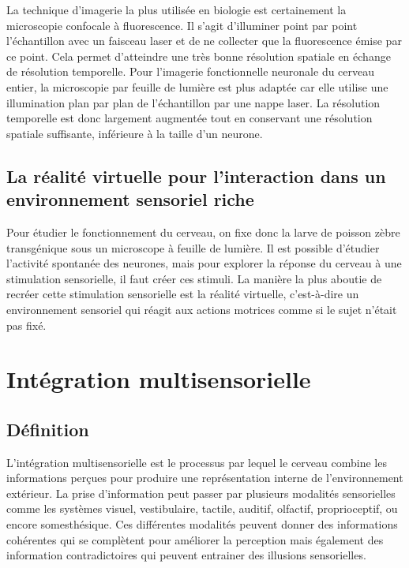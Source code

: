La technique d'imagerie la plus utilisée en biologie est certainement la microscopie confocale à fluorescence. Il s'agit d'illuminer point par point l'échantillon avec un faisceau laser et de ne collecter que la fluorescence émise par ce point. Cela permet d'atteindre une très bonne résolution spatiale en échange de résolution temporelle. Pour l'imagerie fonctionnelle neuronale du cerveau entier, la microscopie par feuille de lumière est plus adaptée car elle utilise une illumination plan par plan de l'échantillon par une nappe laser. La résolution temporelle est donc largement augmentée tout en conservant une résolution spatiale suffisante, inférieure à la taille d'un neurone. 

\subsection{La réalité virtuelle pour l'interaction dans un environnement sensoriel riche }

Pour étudier le fonctionnement du cerveau, on fixe donc la larve de poisson zèbre transgénique sous un microscope à feuille de lumière. Il est possible d'étudier l'activité spontanée des neurones, mais pour explorer la réponse du cerveau à une stimulation sensorielle, il faut créer ces stimuli. La manière la plus aboutie de recréer cette stimulation sensorielle est la réalité virtuelle, c'est-à-dire un environnement sensoriel qui réagit aux actions motrices comme si le sujet n'était pas fixé.

\section{Intégration multisensorielle}

\subsection{Définition}

L'intégration multisensorielle est le processus par lequel le cerveau combine les informations perçues pour produire une représentation interne de l'environnement extérieur. La prise d'information peut passer par plusieurs modalités sensorielles comme les systèmes visuel, vestibulaire, tactile, auditif, olfactif, proprioceptif, ou encore somesthésique. Ces différentes modalités peuvent donner des informations cohérentes qui se complètent pour améliorer la perception mais également des information contradictoires qui peuvent entrainer des illusions sensorielles.

